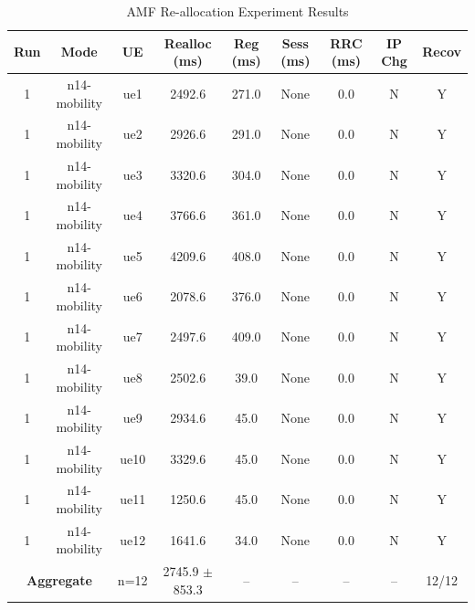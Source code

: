 \begin{table}[ht]
\centering
\begin{tabular}{|c|c|c|c|c|c|c|c|c|}
\hline
Run & Mode & UE & Realloc (ms) & Reg (ms) & Sess (ms) & RRC (ms) & IP Chg & Recov \\
\hline
1 & n14-mobility & ue1 & 2492.6 & 271.0 & None & 0.0 & N & Y \\
1 & n14-mobility & ue2 & 2926.6 & 291.0 & None & 0.0 & N & Y \\
1 & n14-mobility & ue3 & 3320.6 & 304.0 & None & 0.0 & N & Y \\
1 & n14-mobility & ue4 & 3766.6 & 361.0 & None & 0.0 & N & Y \\
1 & n14-mobility & ue5 & 4209.6 & 408.0 & None & 0.0 & N & Y \\
1 & n14-mobility & ue6 & 2078.6 & 376.0 & None & 0.0 & N & Y \\
1 & n14-mobility & ue7 & 2497.6 & 409.0 & None & 0.0 & N & Y \\
1 & n14-mobility & ue8 & 2502.6 & 39.0 & None & 0.0 & N & Y \\
1 & n14-mobility & ue9 & 2934.6 & 45.0 & None & 0.0 & N & Y \\
1 & n14-mobility & ue10 & 3329.6 & 45.0 & None & 0.0 & N & Y \\
1 & n14-mobility & ue11 & 1250.6 & 45.0 & None & 0.0 & N & Y \\
1 & n14-mobility & ue12 & 1641.6 & 34.0 & None & 0.0 & N & Y \\
\multicolumn{2}{|c|}{\textbf{Aggregate}} & n=12 & 2745.9 $\pm$ 853.3 & -- & -- & -- & -- & 12/12 \\
\hline
\end{tabular}
\caption{AMF Re-allocation Experiment Results}
\label{tab:amf_realloc}
\end{table}
